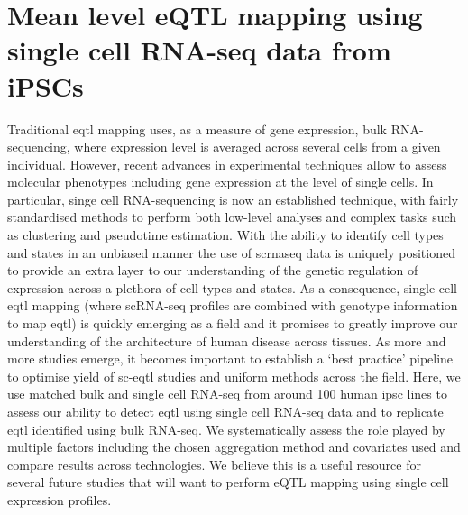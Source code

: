 
\chapter{Mean level eQTL mapping using single cell RNA-seq data from iPSCs}
\label{chapter3}


Traditional \gls{eqtl} mapping uses, as a measure of gene expression, bulk RNA-sequencing, where expression level is averaged across several cells from a given individual.
However, recent advances in experimental techniques allow to assess molecular phenotypes including gene expression at the level of single cells.
In particular, singe cell RNA-sequencing is now an established technique, with fairly standardised methods to perform both low-level analyses and complex tasks such as clustering and pseudotime estimation.
With the ability to identify cell types and states in an unbiased manner the use of \gls{scrnaseq} data is uniquely positioned to provide an extra layer to our understanding of the genetic regulation of expression across a plethora of cell types and states.
As a consequence, single cell \gls{eqtl} mapping (where scRNA-seq profiles are combined with genotype information to map \gls{eqtl}) is quickly emerging as a field and it promises to greatly improve our understanding of the architecture of human disease across tissues.
As more and more studies emerge, it becomes important to establish a `best practice' pipeline to optimise yield of sc-\gls{eqtl} studies and uniform methods across the field.
Here, we use matched bulk and single cell RNA-seq from around 100 human \gls{ipsc} lines to assess our ability to detect \gls{eqtl} using single cell RNA-seq data and to replicate \gls{eqtl} identified using bulk RNA-seq.
We systematically assess the role played by multiple factors including the chosen aggregation method and covariates used and compare results across technologies.
We believe this is a useful resource for several future studies that will want to perform eQTL mapping using single cell expression profiles.

\newpage



